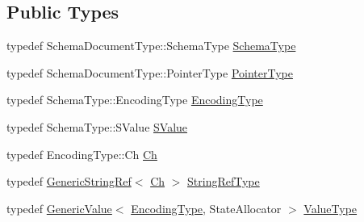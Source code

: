 \subsection*{Public Types}
\begin{DoxyCompactItemize}
\item 
typedef Schema\+Document\+Type\+::\+Schema\+Type \mbox{\hyperlink{classrapidjson_1_1_generic_schema_validator_a0619c9faf3014ef141d1c6d05ae04ddc}{Schema\+Type}}
\item 
typedef Schema\+Document\+Type\+::\+Pointer\+Type \mbox{\hyperlink{classrapidjson_1_1_generic_schema_validator_aace9622f8ebac1c386081f6d1dcd774e}{Pointer\+Type}}
\item 
typedef Schema\+Type\+::\+Encoding\+Type \mbox{\hyperlink{classrapidjson_1_1_generic_schema_validator_abaea0f74722261f6dde0db65594efdfe}{Encoding\+Type}}
\item 
typedef Schema\+Type\+::\+S\+Value \mbox{\hyperlink{classrapidjson_1_1_generic_schema_validator_a545e4e19bd9419d908bc21e1a7a6170d}{S\+Value}}
\item 
typedef Encoding\+Type\+::\+Ch \mbox{\hyperlink{classrapidjson_1_1_generic_schema_validator_ab5b7093443e29cf66eb7cf47f3d8583d}{Ch}}
\item 
typedef \mbox{\hyperlink{structrapidjson_1_1_generic_string_ref}{Generic\+String\+Ref}}$<$ \mbox{\hyperlink{classrapidjson_1_1_generic_schema_validator_ab5b7093443e29cf66eb7cf47f3d8583d}{Ch}} $>$ \mbox{\hyperlink{classrapidjson_1_1_generic_schema_validator_af6d33bab73e771af8c06f2b05e878350}{String\+Ref\+Type}}
\item 
typedef \mbox{\hyperlink{classrapidjson_1_1_generic_value}{Generic\+Value}}$<$ \mbox{\hyperlink{classrapidjson_1_1_generic_schema_validator_abaea0f74722261f6dde0db65594efdfe}{Encoding\+Type}}, State\+Allocator $>$ \mbox{\hyperlink{classrapidjson_1_1_generic_schema_validator_a14216aea798d69f102987c1aae36e897}{Value\+Type}}
\end{DoxyCompactItemize}
